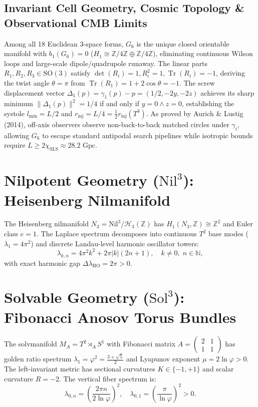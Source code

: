 \documentclass[11pt,a4paper]{article}
\begin{document}
\subsection{Invariant Cell Geometry, Cosmic Topology \& Observational CMB Limits}
Among all 18 Euclidean 3-space forms, $G_6$ is the unique closed orientable manifold with $b_1(G_6) = 0$ ($H_1 \cong \mathbb{Z}/4\mathbb{Z} \oplus \mathbb{Z}/4\mathbb{Z}$), eliminating continuous Wilson loops and large-scale dipole/quadrupole runaway.
The linear parts $R_1, R_2, R_3 \in \mathrm{SO}(3)$ satisfy $\det(R_i) = 1, R_i^2 = 1, \operatorname{Tr}(R_i) = -1$, deriving the twist angle $\theta = \pi$ from $\operatorname{Tr}(R_1) = 1 + 2\cos\theta = -1$.
The screw displacement vector $\Delta_1(p) = \gamma_1(p) - p = (1/2, -2y, -2z)$ achieves its sharp minimum $\|\Delta_1(p)\|^2 = 1/4$ if and only if $y=0 \wedge z=0$, establishing the systole $l_{\min} = L/2$ and $r_{\mathrm{inj}} = L/4 = \frac{1}{2}r_{\mathrm{inj}}(T^3)$.
As proved by Aurich \& Lustig (2014), off-axis observers observe non-back-to-back matched circles under $\gamma_i$, allowing $G_6$ to escape standard antipodal search pipelines while isotropic bounds require $L \ge 2\chi_{\mathrm{SLS}} \approx 28.2\text{ Gpc}$.

\section{Nilpotent Geometry ($\mathrm{Nil}^3$): Heisenberg Nilmanifold}
The Heisenberg nilmanifold $N_3 = \mathrm{Nil}^3/\mathcal{H}_3(\mathbb{Z})$ has $H_1(N_3, \mathbb{Z}) \cong \mathbb{Z}^2$ and Euler class $e=1$. The Laplace spectrum decomposes into continuous $T^2$ base modes ($\lambda_1 = 4\pi^2$) and discrete Landau-level harmonic oscillator towers:
\begin{equation}
\lambda_{k,n} = 4\pi^2 k^2 + 2\pi |k|(2n+1), \quad k \ne 0, \; n \in \mathbb{N},
\end{equation}
with exact harmonic gap $\Delta\lambda_{\mathrm{HO}} = 2\pi > 0$.

\section{Solvable Geometry ($\mathrm{Sol}^3$): Fibonacci Anosov Torus Bundles}
The solvmanifold $M_A = T^2 \rtimes_A S^1$ with Fibonacci matrix $A = \begin{pmatrix} 2 & 1 \\ 1 & 1 \end{pmatrix}$ has golden ratio spectrum $\lambda_1 = \varphi^2 = \frac{3+\sqrt{5}}{2}$ and Lyapunov exponent $\mu = 2\ln\varphi > 0$. The left-invariant metric has sectional curvatures $K \in \{-1, +1\}$ and scalar curvature $R = -2$. The vertical fiber spectrum is:
\begin{equation}
\lambda_{0,n} = \left(\frac{2\pi n}{2\ln\varphi}\right)^2, \quad \lambda_{0,1} = \left(\frac{\pi}{\ln\varphi}\right)^2 > 0.
\end{equation}
\end{document}
